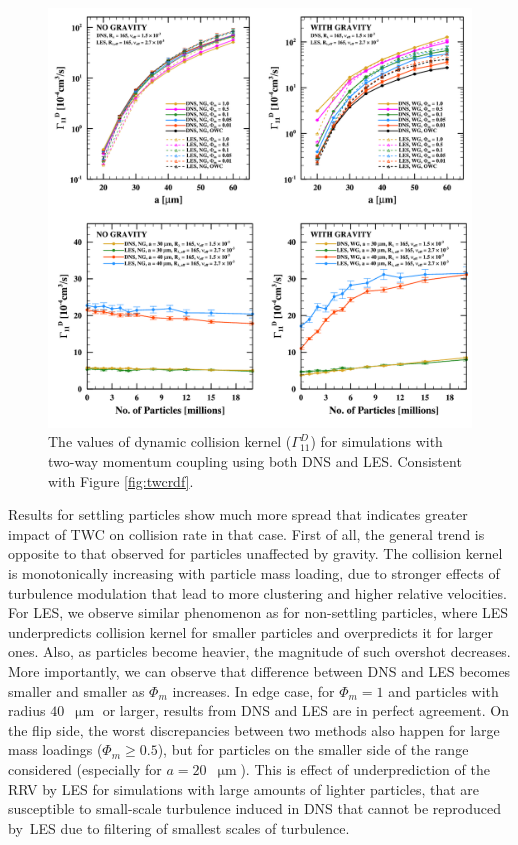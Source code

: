 \documentclass{pracamgren}
\begin{document}
\begin{figure}[h]
\centering
\includegraphics[width=13.5cm]{img/plots/2-2-3e-twcgamma.pdf}
\caption{
The values of dynamic collision kernel ($\Gamma_{11}^D$) for simulations with two-way momentum coupling using both DNS and LES.
Consistent with Figure \ref{fig:twcrdf}.
}
\label{fig:twcgamma}
\end{figure}

Results for settling particles show much more spread that indicates greater impact of TWC on collision rate in that case.
First of all, the general trend is opposite to that observed for particles unaffected by gravity.
The collision kernel is monotonically increasing with particle mass loading, due to stronger effects of turbulence modulation that lead to more clustering and higher relative velocities.
For LES, we observe similar phenomenon as for non-settling particles, where LES underpredicts collision kernel for smaller particles and overpredicts it for larger ones.
Also, as particles become heavier, the magnitude of such overshot decreases.
More importantly, we can observe that difference between DNS and LES becomes smaller and smaller as $\Phi_m$ increases.
In edge case, for $\Phi_m = 1$ and particles with radius $40$~$\upmu\text{m}$ or larger, results from DNS and LES are in perfect agreement.
On the flip side, the worst discrepancies between two methods also happen for large mass loadings ($\Phi_m \ge 0.5$), but for particles on the smaller side of the range considered (especially for $a = 20$~$\upmu\text{m}$).
This is effect of underprediction of the RRV by LES for simulations with large amounts of lighter particles, that are susceptible to small-scale turbulence induced in DNS that cannot be reproduced by~LES due to filtering of smallest scales of turbulence.
\end{document}
